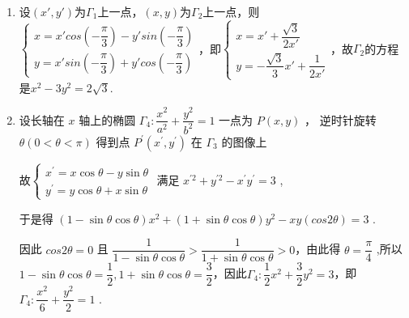 \begin{enumerate}
\begin{jieda}
\begin{enumerate}
            因此$\left\{\begin{array}{l}
                 x' = r cos(\alpha+\theta) = r[cos\alpha cos\theta - sin\alpha sin\theta] = xcos\theta - y sin\theta \\
                 y' = r sin(\alpha+\theta) = r[sin\alpha cos\theta + cos\alpha sin\theta] = x sin\theta + y cos\theta
            \end{array}\right.$

            \item 设$(x', y')$为$\Gamma_1$上一点，$(x, y)$为$\Gamma_2$上一点，则$\left\{\begin{array}{l}
                 x = x'cos\left(-\dfrac{\pi}{3}\right) - y'sin\left(-\dfrac{\pi}{3}\right) \\
                 y = x'sin\left(-\dfrac{\pi}{3}\right)+y'cos\left(-\dfrac{\pi}{3}\right)
            \end{array}\right.$，即$\left\{\begin{array}{l}
                 x = x'+\dfrac{\sqrt{3}}{2x'} \\
                 y = -\dfrac{\sqrt{3}}{3}x'+\dfrac{1}{2x'}
            \end{array}\right.$，故$\Gamma_2$的方程是$x^2-3y^2 = 2\sqrt{3}$.

            \item 设长轴在 $x$ 轴上的椭圆 ${\Gamma }_{4} : \dfrac{{x}^{2}}{{a}^{2}} + \dfrac{{y}^{2}}{{b}^{2}} = 1$ 一点为 $P\left( {x,y}\right)$ ， 逆时针旋转 $\theta \left( {0 < \theta  < \pi }\right)$ 得到点 ${P}^{\prime }\left( {{x}^{\prime },{y}^{\prime }}\right)$ 在 ${\Gamma }_{3}$ 的图像上
            
            故$\left\{\begin{array}{l}
                 {x}^{\prime } = x\cos \theta  - y\sin \theta  \\
                 {y}^{\prime } = y\cos \theta  + x\sin \theta
            \end{array}\right.$ 满足 ${x}^{\prime 2} + {y}^{\prime 2} - {x}^{\prime }{y}^{\prime } = 3$ ,
            
            于是得 $\left( {1 - \sin \theta \cos \theta }\right) {x}^{2} + \left( {1 + \sin \theta \cos \theta }\right) {y}^{2} - {xy}\left( cos2\theta \right)  = 3$ .
            
            因此 $cos2\theta = 0$ 且 $\dfrac{1}{1 - \sin \theta \cos \theta } > \dfrac{1}{1 + \sin \theta \cos \theta } > 0$，由此得 $\theta  = \dfrac{\pi }{4}$ ,所以 $1 - \sin \theta \cos \theta  = \dfrac{1}{2},1 + \sin \theta \cos \theta  = \dfrac{3}{2}$，因此$\Gamma_4: \dfrac{1}{2}{x}^{2} + \dfrac{3}{2}{y}^{2} = 3$，即${\Gamma }_{4} : \dfrac{{x}^{2}}{6} + \dfrac{{y}^{2}}{2} = 1$ .
            

\end{enumerate}
\end{jieda}
\end{enumerate}
